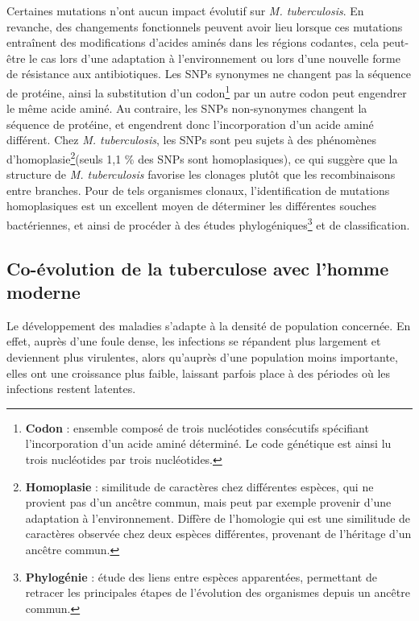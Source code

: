 \documentclass[twoside,a4paper,11pt,frenchb,openany]{report}
\begin{document}
Certaines mutations n'ont aucun impact évolutif sur \textit{M. tuberculosis}. En revanche, des changements fonctionnels peuvent avoir lieu lorsque ces mutations entraînent des modifications d'acides aminés dans les régions codantes, cela peut-être le cas lors d'une adaptation à l'environnement ou lors d'une nouvelle forme de résistance aux antibiotiques. Les SNPs synonymes ne changent pas la séquence de protéine, ainsi la substitution d'un codon\footnote{\textbf{Codon} : ensemble composé de trois nucléotides consécutifs spécifiant l'incorporation d'un acide aminé déterminé. Le code génétique est ainsi lu trois nucléotides par trois nucléotides.} par un autre codon peut engendrer le même acide aminé. Au contraire, les SNPs non-synonymes changent la séquence de protéine, et engendrent donc l'incorporation d'un acide aminé différent. Chez \textit{M. tuberculosis}, les SNPs sont peu sujets à des phénomènes d'homoplasie\footnote{\textbf{Homoplasie} : similitude de caractères chez différentes espèces, qui ne provient pas d'un ancêtre commun, mais peut par exemple provenir d'une adaptation à l'environnement. Diffère de l'homologie qui est une similitude de caractères observée chez deux espèces différentes, provenant de l'héritage d'un ancêtre commun.}(seuls 1,1 \% des SNPs sont homoplasiques), ce qui suggère que la structure de \textit{M. tuberculosis} favorise les clonages plutôt que les recombinaisons entre branches. Pour de tels organismes clonaux, l'identification de mutations homoplasiques est un excellent moyen de déterminer les différentes souches bactériennes, et ainsi de procéder à des études phylogéniques\footnote{\textbf{Phylogénie} : étude des liens entre espèces apparentées, permettant de retracer les principales étapes de l'évolution des organismes depuis un ancêtre commun.} et de classification.


\subsection{Co-évolution de la tuberculose avec l'homme moderne}

Le développement des maladies s'adapte à la densité de population concernée. En effet, auprès d'une foule dense, les infections se répandent plus largement et deviennent plus virulentes, alors qu'auprès d'une population moins importante, elles ont une croissance plus faible, laissant parfois place à des périodes où les infections restent latentes.
\end{document}
